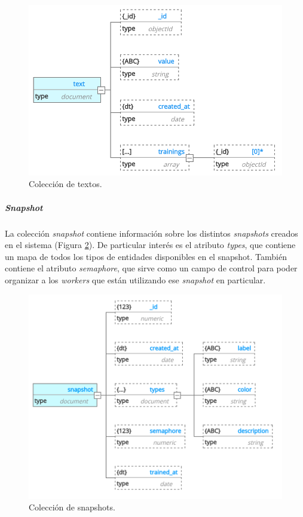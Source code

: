 \documentclass[12pt,a4paper,]{scrartcl}
\let\oldsubparagraph\subparagraph
\renewcommand{\subparagraph}[1]{\oldsubparagraph{#1}\mbox{}}
\begin{document}
\begin{figure}[H]

{\centering \includegraphics{assets/developer/db-text.png} 

}

\caption{Colección de textos.}\label{fig:developer-db-text}
\end{figure}

\hypertarget{snapshot}{%
\subparagraph{\texorpdfstring{\emph{Snapshot}}{Snapshot}}\label{snapshot}}

La colección \emph{snapshot} contiene información sobre los distintos \emph{snapshots} creados en el sistema (Figura \ref{fig:developer-db-snapshot}). De particular interés es el atributo \emph{types}, que contiene un mapa de todos los tipos de entidades disponibles en el snapshot. También contiene el atributo \emph{semaphore}, que sirve como un campo de control para poder organizar a los \emph{workers} que están utilizando ese \emph{snapshot} en particular.

\begin{figure}[H]

{\centering \includegraphics{assets/developer/db-snapshot.pdf} 

}

\caption{Colección de snapshots.}\label{fig:developer-db-snapshot}
\end{figure}
\end{document}

